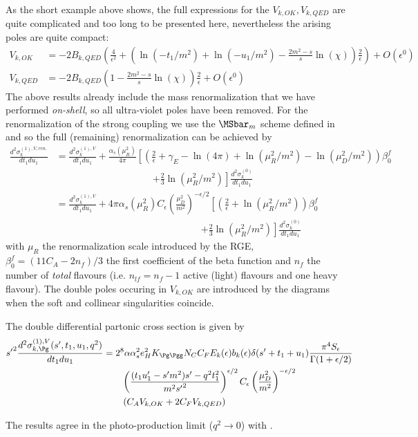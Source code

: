 As the short example above shows, the full expressions for the $V_{k,OK},V_{k,QED}$ are quite complicated and too long to be presented here, nevertheless the arising poles are quite compact:
\begin{align}
V_{k,OK} &= -2B_{k,QED}\left(\frac 4 {\epsilon^2} + \left(\ln(-t_1/m^2) + \ln(-u_1/m^2) -\frac{2m^2-s}{s}\ln(\chi)\right)\frac 2 \epsilon \right) + O(\epsilon^0)\\
V_{k,QED} &= -2B_{k,QED}\left(1-\frac{2m^2-s}{s}\ln(\chi)\right)\frac 2 \epsilon + O(\epsilon^0)
\end{align}
The above results already include the mass renormalization that we have performed \textit{on-shell}, so all ultra-violet poles have been removed. For the renormalization of the strong coupling we use the $\MSbar_m$ scheme defined in \cite{Bojak:2000eu} and so the full (remaining) renormalization can be achieved by
\begin{align}
\frac{d^2\sigma_{k}^{(1),V,ren.}}{dt_1du_1} &=\frac{d^2\sigma_{k}^{(1),V}}{dt_1du_1} + \frac{\alpha_s(\mu_R^2)}{4\pi}\left[\left(\frac 2 \epsilon + \gamma_E-\ln(4\pi)+\ln(\mu_R^2/m^2)-\ln(\mu_D^2/m^2)\right)\beta_0^f \right.\nonumber\\
 &\hspace{120pt}\left.+\frac 2 3 \ln(\mu_R^2/m^2)\right]\frac{d^2\sigma_{k}^{(0)}}{dt_1du_1}\\
&=\frac{d^2\sigma_{k}^{(1),V}}{dt_1du_1} + 4\pi\alpha_s(\mu_R^2)C_\epsilon\left(\frac{\mu_D^2}{m^2}\right)^{-\epsilon/2}\left[\left(\frac 2 \epsilon +\ln(\mu_R^2/m^2)\right)\beta_0^f \right.\nonumber\\
 &\hspace{180pt}\left.+\frac 2 3 \ln(\mu_R^2/m^2)\right]\frac{d^2\sigma_{k}^{(0)}}{dt_1du_1}
\end{align}
with $\mu_R$ the renormalization scale introduced by the RGE, $\beta_0^f = (11C_A- 2n_{f})/3$ the first coefficient of the beta function and $n_f$ the number of \textit{total} flavours (i.e. $n_{lf}=n_f-1$ active (light) flavours and one heavy flavour). The double poles occuring in $V_{k,OK}$ are introduced by the diagrams  when the soft and collinear singularities coincide.

The double differential partonic cross section is given by
\begin{align}
{s'}^2\frac{d^2\sigma_{k,\Pg}^{(1),V}(s',t_1,u_1,q^2)}{dt_1du_1} &= 2^8\alpha\alpha_s^2 e_H^2 K_{\Pg\Pgg}N_CC_F E_k(\epsilon) b_k(\epsilon)\delta(s'+t_1+u_1) \frac{\pi^4 S_\epsilon}{\Gamma(1+\epsilon/2)}  \nonumber\\
 &\hspace{20pt} \left(\frac{(t_1u_1'-s'm^2)s' - q^2t_1^2}{m^2{s'}^2}\right)^{\epsilon/2}C_\epsilon\left(\frac{\mu_D^2}{m^2}\right)^{-\epsilon/2} \nonumber\\
 &\hspace{20pt} \left( C_A V_{k,OK} + 2C_F V_{k,QED}\right)
\end{align}

The results agree in the photo-production limit ($q^2\rightarrow 0$) with \cite{Bojak:1998zm} .
